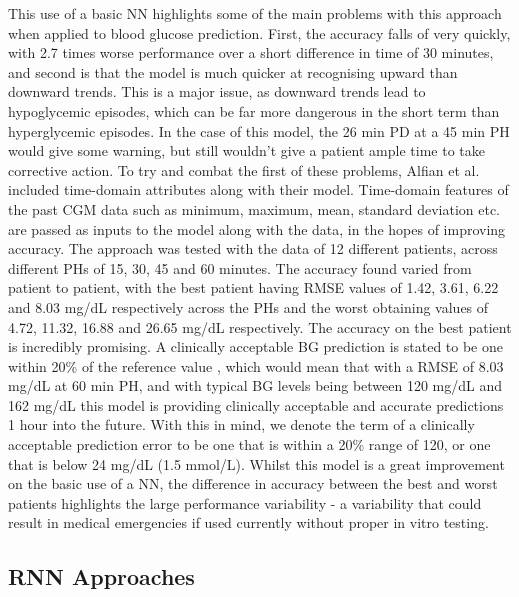       This use of a basic NN highlights some of the main problems with this approach when applied to blood glucose prediction. First, the accuracy falls of very quickly, with 2.7 times worse performance over a short difference in time of 30 minutes, and second is that the model is much quicker at recognising upward than downward trends. This is a major issue, as downward trends lead to hypoglycemic episodes, which can be far more dangerous in the short term than hyperglycemic episodes. In the case of this model, the 26 min PD at a 45 min PH would give some warning, but still wouldn't give a patient ample time to take corrective action. To try and combat the first of these problems, Alfian et al. \cite{paper5} included time-domain attributes along with their model. Time-domain features of the past CGM data such as minimum, maximum, mean, standard deviation etc. are passed as inputs to the model along with the data, in the hopes of improving accuracy. The approach was tested with the data of 12 different patients, across different PHs of 15, 30, 45 and 60 minutes. The accuracy found varied from patient to patient, with the best patient having RMSE values of 1.42, 3.61, 6.22 and 8.03 mg/dL respectively across the PHs and the worst obtaining values of 4.72, 11.32, 16.88 and 26.65 mg/dL respectively. The accuracy on the best patient is incredibly promising. A clinically acceptable BG prediction is stated to be one within 20\% of the reference value \cite{CEGA}, which would mean that with a RMSE of 8.03 mg/dL at 60 min PH, and with typical BG levels being between 120 mg/dL and 162 mg/dL \cite{WHOBGL} this model is providing clinically acceptable and accurate predictions 1 hour into the future. With this in mind, we denote the term of a clinically acceptable prediction error to be one that is within a 20\% range of 120, or one that is below 24 mg/dL (1.5 mmol/L). Whilst this model is a great improvement on the basic use of a NN, the difference in accuracy between the best and worst patients highlights the large performance variability - a variability that could result in medical emergencies if used currently without proper in vitro testing.

      \subsection{RNN Approaches}
